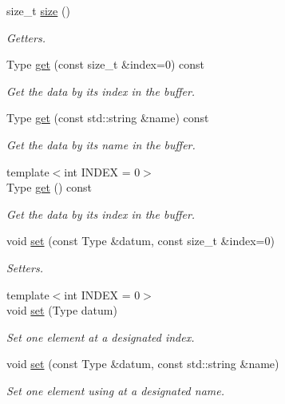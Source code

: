 \begin{DoxyCompactItemize}
size\+\_\+t \hyperlink{classreal__time__tools_1_1SingletypeThreadsafeObject_af09735c0e632800487bc50e4f2f7f512}{size} ()
\begin{DoxyCompactList}\small\item\em Getters. \end{DoxyCompactList}\item 
Type \hyperlink{classreal__time__tools_1_1SingletypeThreadsafeObject_adb4e58f3057002b931e570374cb8604e}{get} (const size\+\_\+t \&index=0) const 
\begin{DoxyCompactList}\small\item\em Get the data by its index in the buffer. \end{DoxyCompactList}\item 
Type \hyperlink{classreal__time__tools_1_1SingletypeThreadsafeObject_a72ed3358cc661ea9d5681ee359aed2e4}{get} (const std\+::string \&name) const 
\begin{DoxyCompactList}\small\item\em Get the data by its name in the buffer. \end{DoxyCompactList}\item 
{\footnotesize template$<$int I\+N\+D\+EX = 0$>$ }\\Type \hyperlink{classreal__time__tools_1_1SingletypeThreadsafeObject_a08d539478b86e0243de5fe2fa1680c06}{get} () const 
\begin{DoxyCompactList}\small\item\em Get the data by its index in the buffer. \end{DoxyCompactList}\item 
void \hyperlink{classreal__time__tools_1_1SingletypeThreadsafeObject_a6d09deb1c28dcddee0a3986184af7bd5}{set} (const Type \&datum, const size\+\_\+t \&index=0)
\begin{DoxyCompactList}\small\item\em Setters. \end{DoxyCompactList}\item 
{\footnotesize template$<$int I\+N\+D\+EX = 0$>$ }\\void \hyperlink{classreal__time__tools_1_1SingletypeThreadsafeObject_a1f852a4b68d3a0ff112cb9c5d7c6b33e}{set} (Type datum)
\begin{DoxyCompactList}\small\item\em Set one element at a designated index. \end{DoxyCompactList}\item 
void \hyperlink{classreal__time__tools_1_1SingletypeThreadsafeObject_ab5776496cf4fa4a015101c81811eb9fc}{set} (const Type \&datum, const std\+::string \&name)
\begin{DoxyCompactList}\small\item\em Set one element using at a designated name. \end{DoxyCompactList}\end{DoxyCompactItemize}
